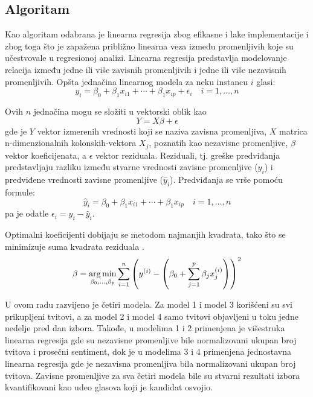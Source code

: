 \subsection{Algoritam}

Kao algoritam odabrana je linearna regresija zbog efikasne i lake implementacije i zbog toga što je zapažena približno linearna veza između promenljivih koje su učestvovale u regresionoj analizi. Linearna regresija predstavlja modelovanje relacija između jedne ili više zavisnih promenljivih i jedne ili više nezavisnih promenljivih. Opšta jednačina linearnog modela za neku instancu $i$ glasi:
\begin{equation*}
    y_i = \beta_0 + \beta_1 x_{i1} + \cdots + \beta_1 x_{ip} + \epsilon_i \quad i = 1, \dots, n
\end{equation*}

Ovih $n$ jednačina mogu se složiti u vektorski oblik kao
\begin{equation*}
    Y = X\beta + \epsilon
\end{equation*}
gde je $Y$ vektor izmerenih vrednosti koji se naziva zavisna promenljiva, $X$ matrica n-dimenzionalnih kolonskih-vektora $X_j$, poznatih kao nezavisne promenljive, $\beta$ vektor koeficijenata, a $\epsilon$ vektor reziduala. Reziduali, tj. greške predviđanja predstavljaju razliku između stvarne vrednosti zavisne promenljive ($y_i$) i predviđene vrednosti zavisne promenljive ($\hat{y}_i$). Predviđanja se vrše pomoću formule:
\begin{equation*}
    \hat{y}_i = \beta_0 + \beta_1 x_{i1} + \cdots + \beta_1 x_{ip} \quad i = 1, \dots, n
\end{equation*}
pa je odatle $\epsilon_i = y_i - \hat{y}_i$.

Optimalni koeficijenti dobijaju se metodom najmanjih kvadrata, tako što se minimizuje suma kvadrata reziduala \parencite{taboga2017linear}.
\begin{equation*}
    \beta = \operatorname*{arg\,min}_{\beta_0,\dots,\beta_p} \sum^n_{i=1} \left(
        y^{(i)} - \left(
            \beta_0 + \sum^p_{j=1} \beta_j x^{(i)}_j
        \right)
    \right)^2
\end{equation*}

U ovom radu razvijeno je četiri modela. Za model 1 i model 3 korišćeni su svi prikupljeni tvitovi, a za model 2 i model 4 samo tvitovi objavljeni u toku jedne nedelje pred dan izbora. Takođe, u modelima 1 i 2 primenjena je višestruka linearna regresija gde su nezavisne promenljive bile normalizovani ukupan broj tvitova i prosečni sentiment, dok je u modelima 3 i 4 primenjena jednostavna linearna regresija gde je nezavisna promenljiva bila normalizovani ukupan broj tvitova. Zavisne promenljive za sva četiri modela bile su stvarni rezultati izbora kvantifikovani kao udeo glasova koji je kandidat osvojio.

